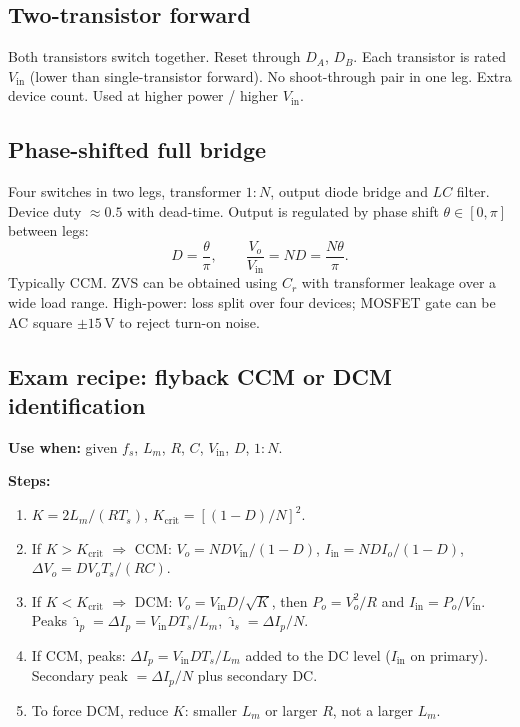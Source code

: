 \subsection{Two-transistor forward}
Both transistors switch together. Reset through \(D_A\), \(D_B\). Each transistor is rated \(V_{\mathrm{in}}\) (lower than single-transistor forward). No shoot-through pair in one leg. Extra device count. Used at higher power / higher \(V_{\mathrm{in}}\).

\subsection{Phase-shifted full bridge}
Four switches in two legs, transformer \(1:N\), output diode bridge and \(LC\) filter. Device duty \(\approx 0.5\) with dead-time. Output is regulated by phase shift \(\theta\in[0,\pi]\) between legs:
\[
D=\frac{\theta}{\pi},\qquad \frac{V_o}{V_{\mathrm{in}}}=N D=\frac{N\theta}{\pi}.
\]
Typically CCM. ZVS can be obtained using \(C_r\) with transformer leakage over a wide load range. High-power: loss split over four devices; MOSFET gate can be AC square \(\pm 15\,\mathrm{V}\) to reject turn-on noise.

\subsection{Exam recipe: flyback CCM or DCM identification}
\textbf{Use when:} given \(f_s\), \(L_m\), \(R\), \(C\), \(V_{\mathrm{in}}\), \(D\), \(1:N\).

\textbf{Steps:}
\begin{enumerate}
  \item \(K=2 L_m/(R T_s)\), \(K_{\mathrm{crit}}=[(1-D)/N]^2\).
  \item If \(K>K_{\mathrm{crit}}\) \(\Rightarrow\) CCM: \(V_o=N D V_{\mathrm{in}}/(1-D)\), \(I_{\mathrm{in}}=N D I_o/(1-D)\), \(\Delta V_o=D V_o T_s/(R C)\).
  \item If \(K<K_{\mathrm{crit}}\) \(\Rightarrow\) DCM: \(V_o=V_{\mathrm{in}} D/\sqrt{K}\), then \(P_o=V_o^2/R\) and \(I_{\mathrm{in}}=P_o/V_{\mathrm{in}}\). Peaks \(\hat{\imath}_p=\Delta I_p=V_{\mathrm{in}} D T_s/L_m\), \(\hat{\imath}_s=\Delta I_p/N\).
  \item If CCM, peaks: \(\Delta I_p=V_{\mathrm{in}} D T_s/L_m\) added to the DC level (\(I_{\mathrm{in}}\) on primary). Secondary peak \(=\Delta I_p/N\) plus secondary DC.
  \item To force DCM, reduce \(K\): smaller \(L_m\) or larger \(R\), not a larger \(L_m\).
\end{enumerate}

